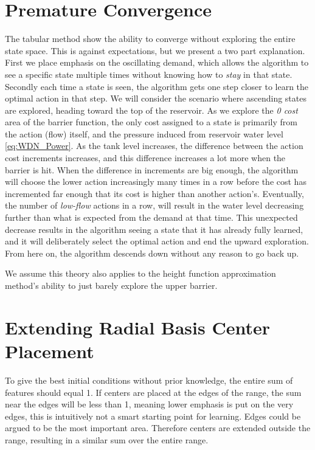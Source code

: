 \section{Premature Convergence}
The tabular method show the ability to converge without exploring the entire state space. This is against expectations, but we present a two part explanation. First we place emphasis on the oscillating demand, which allows the algorithm to see a specific state multiple times without knowing how to \textit{stay} in that state. Secondly each time a state is seen, the algorithm gets one step closer to learn the optimal action in that step. We will consider the scenario where ascending states are explored, heading toward the top of the reservoir. As we explore the \textit{0 cost} area of the barrier function, the only cost assigned to a state is primarily from the action (flow) itself, and the pressure induced from reservoir water level \ref{eq:WDN_Power}. As the tank level increases, the difference between the action cost increments increases, and this difference increases a lot more when the barrier is hit. When the difference in increments are big enough, the algorithm will choose the lower action increasingly many times in a row before the cost has incremented far enough that its cost is higher than another action's. Eventually, the number of \textit{low-flow} actions in a row, will result in the water level decreasing further than what is expected from the demand at that time. This unexpected decrease results in the algorithm seeing a state that it has already fully learned, and it will deliberately select the optimal action and end the upward exploration. From here on, the algorithm descends down without any reason to go back up.

We assume this theory also applies to the height function approximation method's ability to just barely explore the upper barrier. 


\section{Extending Radial Basis Center Placement}
To give the best initial conditions without prior knowledge, the entire sum of features should equal 1. If centers are placed at the edges of the range, the sum near the edges will be less than 1, meaning lower emphasis is put on the very edges, this is intuitively not a smart starting point for learning. Edges could be argued to be the most important area. Therefore centers are extended outside the range, resulting in a similar sum over the entire range. 

